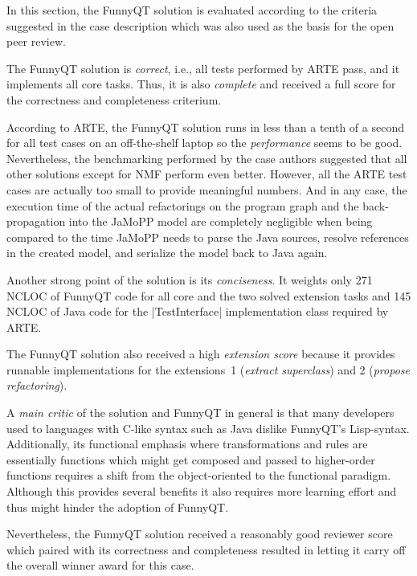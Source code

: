 \documentclass[submission]{eptcs}
\newcommand{\code}{\clojureinline}
\begin{document}
In this section, the FunnyQT solution is evaluated according to the criteria
suggested in the case description which was also used as the basis for the open
peer review.

The FunnyQT solution is \emph{correct}, i.e., all tests performed by ARTE pass,
and it implements all core tasks.  Thus, it is also \emph{complete} and
received a full score for the correctness and completeness criterium.

According to ARTE, the FunnyQT solution runs in less than a tenth of a second
for all test cases on an off-the-shelf laptop so the \emph{performance} seems
to be good.  Nevertheless, the benchmarking performed by the case authors
suggested that all other solutions except for NMF perform even better.
However, all the ARTE test cases are actually too small to provide meaningful
numbers.  And in any case, the execution time of the actual refactorings on the
program graph and the back-propagation into the JaMoPP model are completely
negligible when being compared to the time JaMoPP needs to parse the Java
sources, resolve references in the created model, and serialize the model back
to Java again.

Another strong point of the solution is its \emph{conciseness}.  It weights
only 271 NCLOC of FunnyQT code for all core and the two solved extension tasks
and 145 NCLOC of Java code for the \code|TestInterface| implementation class
required by ARTE.

The FunnyQT solution also received a high \emph{extension score} because it
provides runnable implementations for the extensions~1 (\emph{extract
  superclass}) and 2 (\emph{propose refactoring}).

A \emph{main critic} of the solution and FunnyQT in general is that many
developers used to languages with C-like syntax such as Java dislike FunnyQT's
Lisp-syntax.  Additionally, its functional emphasis where transformations and
rules are essentially functions which might get composed and passed to
higher-order functions requires a shift from the object-oriented to the
functional paradigm.  Although this provides several benefits it also requires
more learning effort and thus might hinder the adoption of FunnyQT.

Nevertheless, the FunnyQT solution received a reasonably good reviewer score
which paired with its correctness and completeness resulted in letting it carry
off the overall winner award for this case.




\end{document}
